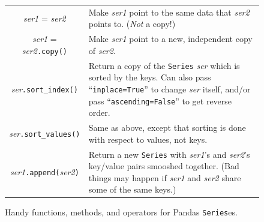 \begin{figure}[ht]
\begin{tabular}{c|p{3.1in}}
\textsl{ser1} = \textsl{ser2} & Make \textsl{ser1} point to the same data that
\textsl{ser2} points to. (\textit{Not} a copy!)\\

\textsl{ser1} = \textsl{ser2}\texttt{.copy()} & Make \textsl{ser1} point to a
new, independent copy of \textsl{ser2}. \\

\textsl{ser}\texttt{.sort\_index()} & Return a copy of the \texttt{Series}
\textsl{ser} which is sorted by the keys. Can also pass
``\texttt{inplace=True}'' to change \textsl{ser} itself, and/or pass
``\texttt{ascending=False}'' to get reverse order. \\

\textsl{ser}\texttt{.sort\_values()} & Same as above, except that sorting is
done with respect to values, not keys. \\

\textsl{ser1}\texttt{.append(}\textsl{ser2}\texttt{)} & 
Return a new \texttt{Series} with \textsl{ser1}'s and \textsl{ser2}'s key/value
pairs smooshed together. (Bad things may happen if \textsl{ser1} and
\textsl{ser2} share some of the same keys.) \\

\end{tabular}
\bigskip
\caption{Handy functions, methods, and operators for Pandas \texttt{Series}es.}
\label{fig:handySeries}
\end{figure}
